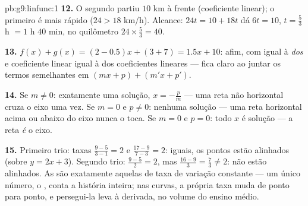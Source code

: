 \begin{solution}{pb:g9:linfunc:1}
\textbf{12.} O segundo partiu $10$ km à frente (coeficiente linear); o
primeiro é mais rápido ($24 > 18$ km/h). Alcance:
$24t = 10 + 18t$ dá $6t = 10$, $t = \frac53$ h $= 1$ h $40$ min, no
quilômetro $24 \times \frac53 = 40$.

\textbf{13.} $f(x) + g(x) = (2 - 0.5)x + (3 + 7) = 1.5x + 10$: afim,
com  igual à \emph{ dos }
e coeficiente linear igual à  dos coeficientes lineares --- fica
claro ao juntar os termos semelhantes em $(mx + p) + (m'x + p')$.

\textbf{14.} Se $m \neq 0$: exatamente uma solução, $x = -\frac pm$
--- uma reta não horizontal cruza o eixo uma vez. Se $m = 0$ e
$p \neq 0$: nenhuma solução --- uma reta horizontal acima ou abaixo do
eixo nunca o toca. Se $m = 0$ e $p = 0$: todo $x$ é solução --- a reta
\emph{é} o eixo.

\textbf{15.} Primeiro trio: taxas $\frac{9 - 5}{3 - 1} = 2$ e
$\frac{17 - 9}{7 - 3} = 2$: iguais, os pontos estão alinhados (sobre
$y = 2x + 3$). Segundo trio: $\frac{9-5}{2} = 2$, mas
$\frac{16 - 9}{3} = \frac73 \neq 2$: não estão alinhados. As  são exatamente aquelas de taxa de variação constante --- um único
número, o , conta a história inteira; nas curvas, a
própria taxa muda de ponto para ponto, e persegui-la leva à derivada,
no volume do ensino médio.
\end{solution}
